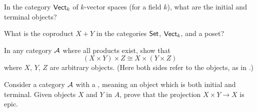 \begin{problem}
	In the category $\catname{Vect}_k$ of $k$-vector spaces
	(for a field $k$),
	what are the initial and terminal objects?
\end{problem}

\begin{dproblem}
	What is the coproduct $X+Y$ in the categories
	$\catname{Set}$, $\catname{Vect}_k$, and a poset?
\end{dproblem}

\begin{problem}
	In any category $\AA$ where all products exist,
	show that \[ (X \times Y) \times Z \cong X \times (Y \times Z) \]
	where $X$, $Y$, $Z$ are arbitrary objects.
	(Here both sides refer to the objects, as in .)
	\label{prob:associative_product}
\end{problem}

\begin{problem}
	\gim
	Consider a category $\AA$ with a ,
	meaning an object which is both initial and terminal.
	Given objects $X$ and $Y$ in $A$,
	prove that the projection $X \times Y \to X$ is epic.
\end{problem}
